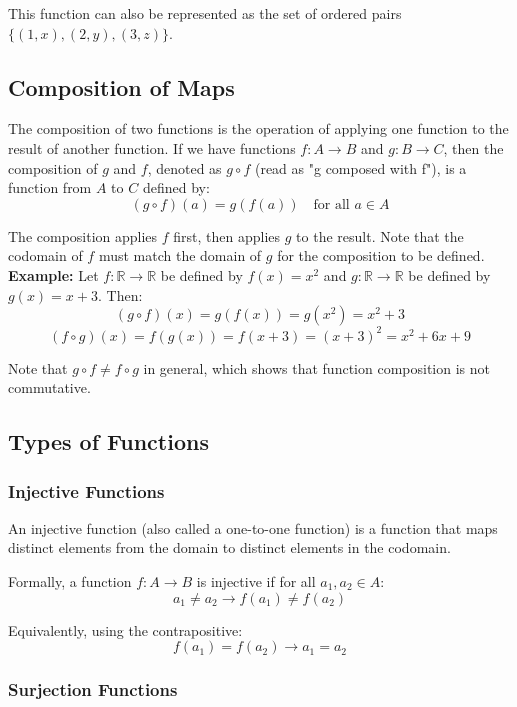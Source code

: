 This function can also be represented as the set of ordered pairs \(\{(1,x), (2,y), (3,z)\}\).

\subsection{Composition of Maps}
The composition of two functions is the operation of applying one function to the result of another function. If we have functions \(f: A \to B\) and \(g: B \rightarrow C\), then the composition of \(g\) and \(f\), denoted as \(g \circ f\) (read as "g composed with f"), is a function from \(A\) to \(C\) defined by:
\[
	(g \circ f)(a) = g(f(a)) \quad \text{for all } a \in A
\]

The composition applies \(f\) first, then applies \(g\) to the result. Note that the codomain of \(f\) must match the domain of \(g\) for the composition to be defined.
\newline
\textbf{Example:} Let \(f: \mathbb{R} \to \mathbb{R}\) be defined by \(f(x) = x^2\) and \(g: \mathbb{R} \rightarrow \mathbb{R}\) be defined by \(g(x) = x+3\). Then:
\[
	(g \circ f)(x) = g(f(x)) = g(x^2) = x^2 + 3
\]
\[
	(f \circ g)(x) = f(g(x)) = f(x+3) = (x+3)^2 = x^2 + 6x + 9
\]

Note that \(g \circ f \neq f \circ g\) in general, which shows that function composition is not commutative.

\subsection{Types of Functions}

\subsubsection*{Injective Functions}

An injective function (also called a one-to-one function) is a function that maps distinct elements from the domain to distinct elements in the codomain.

Formally, a function \(f: A \to B\) is injective if for all \(a_1, a_2 \in A\):
\[
	a_1 \neq a_2 \to f(a_1) \neq f(a_2)
\]

Equivalently, using the contrapositive:
\[
	f(a_1) = f(a_2) \to a_1 = a_2
\]

\subsubsection*{Surjection Functions}

